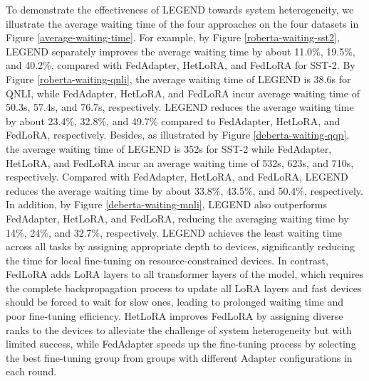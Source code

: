 To demonstrate the effectiveness of LEGEND towards system heterogeneity, we illustrate the average waiting time of the four approaches on the four datasets in Figure \ref{average-waiting-time}.
For example, by Figure \ref{roberta-waiting-sst2}, LEGEND separately improves the average waiting time by about 11.0\%, 19.5\%, and 40.2\%, compared with FedAdapter, HetLoRA, and FedLoRA for SST-2.
By Figure \ref{roberta-waiting-qnli}, the average waiting time of LEGEND is 38.6s for QNLI, while FedAdapter, HetLoRA, and FedLoRA incur average waiting time of 50.3s, 57.4s, and 76.7s, respectively.
LEGEND reduces the average waiting time by about 23.4\%, 32.8\%, and 49.7\% compared to FedAdapter, HetLoRA, and FedLoRA, respectively.
Besides, as illustrated by Figure \ref{deberta-waiting-qqp}, the average waiting time of LEGEND is 352s for SST-2 while FedAdapter, HetLoRA, and FedLoRA incur an average waiting time of 532s, 623s, and 710s, respectively.
Compared with FedAdapter, HetLoRA, and FedLoRA, LEGEND reduces the average waiting time by about 33.8\%, 43.5\%, and 50.4\%, respectively.
In addition, by Figure \ref{deberta-waiting-mnli}, LEGEND also outperforms FedAdapter, HetLoRA, and FedLoRA, reducing the averaging waiting time by 14\%, 24\%, and 32.7\%, respectively.
LEGEND achieves the least waiting time across all tasks by assigning appropriate depth to devices, significantly reducing the time for local fine-tuning on resource-constrained devices.
In contrast, FedLoRA adds LoRA layers to all transformer layers of the model, which requires the complete backpropagation process to update all LoRA layers and fast devices should be forced to wait for slow ones, leading to prolonged waiting time and poor fine-tuning efficiency.
HetLoRA improves FedLoRA by assigning diverse ranks to the devices to alleviate the challenge of system heterogeneity but with limited success, while FedAdapter speeds up the fine-tuning process by selecting the best fine-tuning group from groups with different Adapter configurations in each round.
